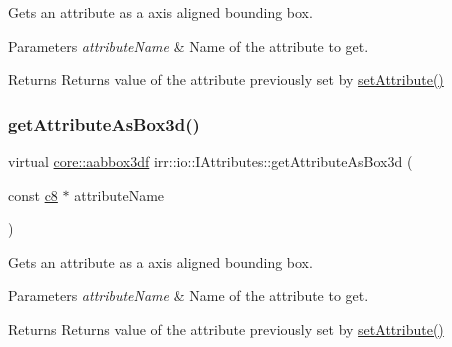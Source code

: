 Gets an attribute as a axis aligned bounding box. 


\begin{DoxyParams}{Parameters}
{\em attribute\+Name} & Name of the attribute to get. \\
\hline
\end{DoxyParams}
\begin{DoxyReturn}{Returns}
Returns value of the attribute previously set by \hyperlink{classirr_1_1io_1_1IAttributes_a03fa31acb481ae23678676cc183f09a6}{set\+Attribute()} 
\end{DoxyReturn}
\mbox{\label{classirr_1_1io_1_1IAttributes_a215218b9b1ebb8313557b44bb3bce363}} 
\subsubsection{\texorpdfstring{get\+Attribute\+As\+Box3d()}{getAttributeAsBox3d()}\hspace{0.1cm}{\footnotesize\ttfamily [2/4]}}
{\footnotesize\ttfamily virtual \hyperlink{namespaceirr_1_1core_a60f4b4c744aba55f10530d503c6ecb04}{core\+::aabbox3df} irr\+::io\+::\+I\+Attributes\+::get\+Attribute\+As\+Box3d (\begin{DoxyParamCaption}\item[{const \hyperlink{namespaceirr_a9395eaea339bcb546b319e9c96bf7410}{c8} $\ast$}]{attribute\+Name }\end{DoxyParamCaption})\hspace{0.3cm}{\ttfamily [pure virtual]}}



Gets an attribute as a axis aligned bounding box. 


\begin{DoxyParams}{Parameters}
{\em attribute\+Name} & Name of the attribute to get. \\
\hline
\end{DoxyParams}
\begin{DoxyReturn}{Returns}
Returns value of the attribute previously set by \hyperlink{classirr_1_1io_1_1IAttributes_a03fa31acb481ae23678676cc183f09a6}{set\+Attribute()} 
\end{DoxyReturn}
\mbox{\label{classirr_1_1io_1_1IAttributes_a3da2aafbf1bfe8bcdb7dfa2866a4efe4}} 
